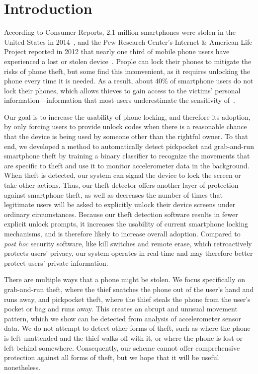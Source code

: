 \section{Introduction}

According to Consumer Reports, 2.1 million smartphones were stolen in the United States in 2014~\cite{deitrick:consumer}, and the Pew Research Center's Internet \& American Life Project reported in 2012 that nearly one third of mobile phone users have experienced a lost or stolen device~\cite{boyles:pew}.
People can lock their phones to mitigate the risks of phone theft, but some find this inconvenient, as it requires unlocking the phone every time it is needed.
As a result, about 40\% of smartphone users do not lock their phones, which allows thieves to gain access to the victims' personal information---information that most users underestimate the sensitivity of~\cite{egelman:lock}.

Our goal is to increase the usability of phone locking, and therefore its adoption, by only forcing users to provide unlock codes when there is a reasonable chance that the device is being used by someone other than the rightful owner.
To that end, we developed a method to automatically detect pickpocket and grab-and-run smartphone theft by training a binary classifier to recognize the movements that are specific to theft and use it to monitor accelerometer data in the background.
When theft is detected, our system can signal the device to lock the screen or take other actions.
Thus, our theft detector offers another layer of protection against smartphone theft, as well as decreases the number of times that legitimate users will be asked to explicitly unlock their device screens under ordinary circumstances.
Because our theft detection software results in fewer explicit unlock prompts, it increases the usability of current smartphone locking mechanisms, and is therefore likely to increase overall adoption. Compared to {\it post hoc} security software, like kill switches and remote erase, which retroactively protects users' privacy, our system operates in real-time and may therefore better protect users' private information.

There are multiple ways that a phone might be stolen.
We focus specifically on grab-and-run theft, where the thief snatches the phone out of the user's hand and runs away, and pickpocket theft, where the thief steals the phone from the user's pocket or bag and runs away.
This creates an abrupt and unusual movement pattern, which we show can be detected from analysis of accelerometer sensor data.
We do not attempt to detect other forms of theft, such as where the phone is left unattended and the thief walks off with it, or where the phone is lost or left behind somewhere.
Consequently, our scheme cannot offer comprehensive protection against all forms of theft, but we hope that it will be useful nonetheless.

